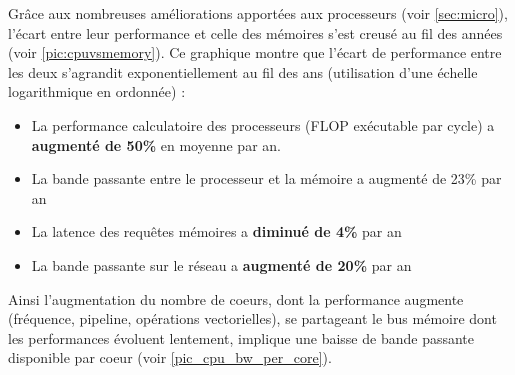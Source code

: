         Grâce aux nombreuses améliorations apportées aux processeurs (voir \autoref{sec:micro}), l'écart entre leur performance et celle des mémoires s'est creusé au fil des années (voir \autoref{pic:cpuvsmemory}).  Ce graphique montre que l'écart de performance entre les deux s’agrandit exponentiellement au fil des ans (utilisation d'une échelle logarithmique en ordonnée) :
       \begin{itemize}                 
            \item La performance calculatoire des processeurs (\gls{FLOP} exécutable par cycle) a \textbf{augmenté de 50\%} en moyenne par an.
            \item La bande passante entre le processeur et la mémoire a augmenté de 23\% par an                 
            \item La latence des requêtes mémoires a \textbf{diminué de 4\% } par an                 
            \item La bande passante sur le réseau a \textbf{augmenté de 20\%} par an             
        \end{itemize}
        Ainsi l’augmentation du nombre de coeurs, dont la performance augmente (fréquence, pipeline, opérations vectorielles), se partageant le bus mémoire dont les performances évoluent lentement, implique une baisse de bande passante disponible par coeur (voir \autoref{pic_cpu_bw_per_core}). 
         
